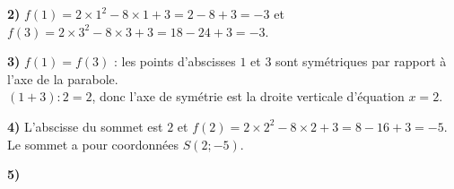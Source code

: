\documentclass[11pt,a4paper]{book}
\begin{document}
\medskip
\begin{corrBox}
	\textbf{2)} $f(1)=2\times1^2-8\times1+3=2-8+3=-3$ \quad et \quad $f(3)=2\times3^2-8\times3+3=18-24+3=-3$.
\end{corrBox}

\medskip
\begin{corrBox}
	\textbf{3)} $f(1)=f(3)$ : les points d'abscisses $1$ et $3$ sont symétriques par rapport à l'axe de la parabole.\\
	$(1+3):2=2$, donc l'axe de symétrie est la droite verticale d'équation $x=2$.
\end{corrBox}

\medskip
\begin{corrBox}
	\textbf{4)} L'abscisse du sommet est $2$ et $f(2)=2\times2^2-8\times2+3=8-16+3=-5$.\\
	Le sommet a pour coordonnées $S(2 ; -5)$.
\end{corrBox}

\medskip
\begin{corrBox}
	\textbf{5)}
	\begin{center}
	\end{center}
\end{corrBox}
\end{document}

